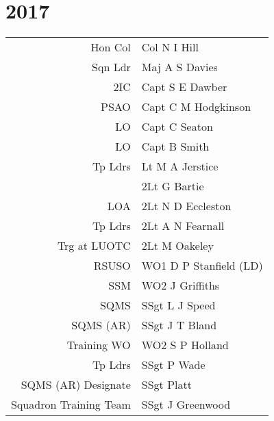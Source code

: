\chapter*{2017}

\begin{center}
  \begin{tabular}{rl}
    Hon Col & Col N I Hill \\
    Sqn Ldr & Maj A S Davies \\
    2IC & Capt S E Dawber \\
    PSAO & Capt C M Hodgkinson \\
    LO & Capt C Seaton \\
    LO & Capt B Smith \\
    Tp Ldrs & Lt M A Jerstice \\
     & 2Lt G Bartie \\
    LOA & 2Lt N D Eccleston \\
    Tp Ldrs & 2Lt A N Fearnall \\
    Trg at LUOTC & 2Lt M Oakeley \\
    RSUSO & WO1 D P Stanfield (LD) \\
    SSM & WO2 J Griffiths \\
    SQMS & SSgt L J Speed \\
    SQMS (AR) & SSgt J T Bland \\
    Training WO & WO2 S P Holland \\
    Tp Ldrs & SSgt P Wade \\
    SQMS (AR) Designate & SSgt Platt \\
    Squadron Training Team & SSgt J Greenwood \\
  \end{tabular}
\end{center}

